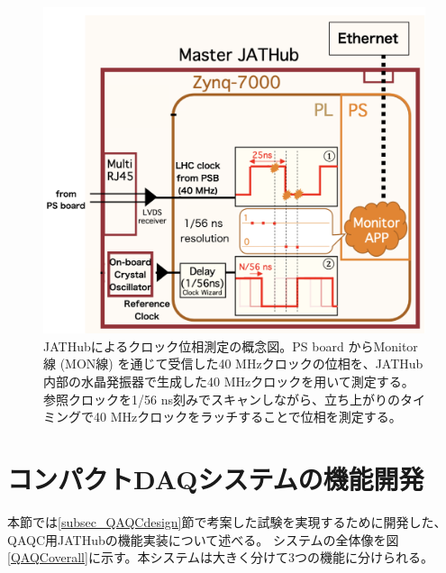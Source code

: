 \begin{figure} 
    \centering
    \includegraphics[width=14cm]{fig/QAQC/JATHubclockmasurement.png}
    \caption[JATHubによるクロック位相測定の概念図]{JATHubによるクロック位相測定の概念図\cite{mt_atanaka}。PS board からMonitor線 (MON線) を通じて受信した40 MHzクロックの位相を、JATHub内部の水晶発振器で生成した40 MHzクロックを用いて測定する。参照クロックを1/56 ns刻みでスキャンしながら、立ち上がりのタイミングで40 MHzクロックをラッチすることで位相を測定する。}
    \label{JATHubclockmeasure}
\end{figure}    

\clearpage
\section{コンパクトDAQシステムの機能開発}
\label{sec_QAQC_JATHub}
本節では\ref{subsec_QAQCdesign}節で考案した試験を実現するために開発した、QAQC用JATHubの機能実装について述べる。
システムの全体像を図\ref{QAQCoverall}に示す。本システムは大きく分けて3つの機能に分けられる。

